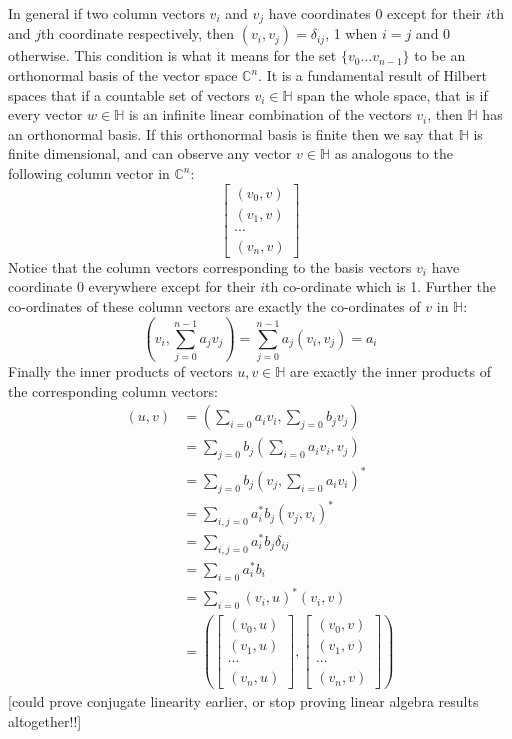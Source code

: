 In general if two column vectors $v_i$ and $v_j$ have coordinates 0 except for their $i$th and $j$th coordinate respectively, then $(v_i, v_j) = \delta_{ij}$, 1 when $i = j$ and 0 otherwise. This condition is what it means for the set $\{v_0 \dots v_{n-1}\}$ to be an orthonormal basis of the vector space $\mathbb{C}^n$. It is a fundamental result of Hilbert spaces that if a countable set of vectors $v_i \in \mathbb{H}$ span the whole space, that is if every vector $w \in \mathbb{H}$ is an infinite linear combination of the vectors $v_i$, then $\mathbb{H}$ has an orthonormal basis. If this orthonormal basis is finite then we say that $\mathbb{H}$ is finite dimensional, and can observe any vector $v \in \mathbb{H}$ as analogous to the following column vector in $\mathbb{C}^n$:
\[\left[\begin{matrix}
	(v_0, v)\\
	(v_1, v)\\
	\cdots\\
	(v_n, v)
\end{matrix}\right]\]
Notice that the column vectors corresponding to the basis vectors $v_i$ have coordinate 0 everywhere except for their $i$th co-ordinate which is 1. Further the co-ordinates of these column vectors are exactly the co-ordinates of $v$ in $\mathbb{H}$:
\[\left(v_i, \sum_{j=0}^{n-1} a_jv_j\right) = \sum_{j=0}^{n-1} a_j\left(v_i, v_j\right) = a_i\]
Finally the inner products of vectors $u, v \in \mathbb{H}$ are exactly the inner products of the corresponding column vectors:
\begin{align*}
	(u, v) &= \left(\sum_{i=0}a_iv_i, \sum_{j=0} b_jv_j\right)
	\\&= \sum_{j=0}b_j \left(\sum_{i=0}a_iv_i, v_j\right)
	\\&= \sum_{j=0}b_j \left(v_j, \sum_{i=0}a_iv_i\right)^*
	\\&= \sum_{i,j=0}a_i^*b_j \left(v_j, v_i\right)^*
	\\&= \sum_{i,j=0}a_i^*b_j \delta_{ij}
	\\&= \sum_{i=0}a_i^*b_i
	\\&= \sum_{i=0}(v_i, u)^*(v_i, v)
	\\&= \left(
	\left[\begin{matrix}
		(v_0, u)\\
		(v_1, u)\\
		\cdots\\
		(v_n, u)
	\end{matrix}\right]
	,
	\left[\begin{matrix}
		(v_0, v)\\
		(v_1, v)\\
		\cdots\\
		(v_n, v)
	\end{matrix}\right]
	\right)
\end{align*}
[could prove conjugate linearity earlier, or stop proving linear algebra results altogether!!]

